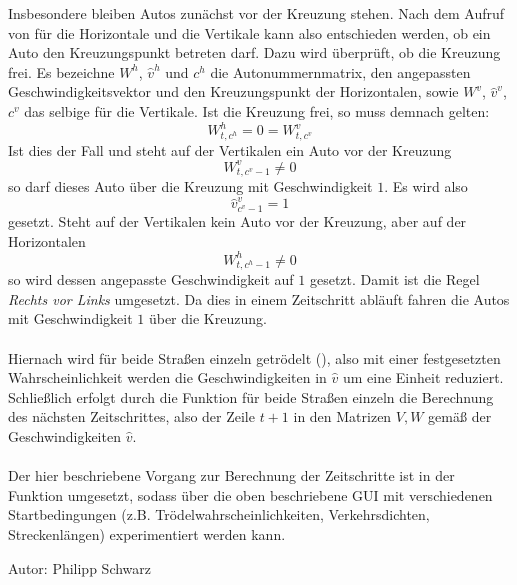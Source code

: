 Insbesondere bleiben Autos zunächst vor der Kreuzung stehen. Nach dem Aufruf von  für die
Horizontale und die Vertikale kann also entschieden werden, ob ein Auto den Kreuzungspunkt betreten darf. 
Dazu wird überprüft, ob die Kreuzung frei. Es bezeichne \(W^h\), \(\hat{v}^h\) und \(c^h\) 
die Autonummernmatrix, den angepassten Geschwindigkeitsvektor und den Kreuzungspunkt der Horizontalen, sowie
\(W^v\), \(\hat{v}^v\), \(c^v\) das selbige für die Vertikale. Ist die Kreuzung frei, so muss demnach gelten: 
\[W^h_{t,c^h} = 0 = W^v_{t,c^v}\] 
Ist dies der Fall und steht auf der Vertikalen
ein Auto vor der Kreuzung 
\[W^v_{t,c^v-1} \neq 0\] so darf dieses Auto über die Kreuzung mit Geschwindigkeit \(1\). 
Es wird also 
\[\hat{v}^v_{c^v-1} = 1\] 
gesetzt. Steht auf der Vertikalen kein Auto vor der Kreuzung, 
aber auf der Horizontalen 
\[W^h_{t,c^h-1} \neq 0\]
so wird dessen angepasste Geschwindigkeit auf \(1\) gesetzt. 
Damit ist die Regel \textit{Rechts vor Links} umgesetzt.
Da dies in einem Zeitschritt abläuft fahren die Autos mit Geschwindigkeit \(1\) über die Kreuzung.
\\ \\
Hiernach wird für beide Straßen einzeln getrödelt (), also mit einer festgesetzten Wahrscheinlichkeit werden
die Geschwindigkeiten in \(\hat{v}\) um eine Einheit reduziert. 
Schließlich erfolgt durch die Funktion  für beide Straßen einzeln die Berechnung des nächsten Zeitschrittes, 
also der Zeile \(t+1\) in den Matrizen \(V,W\) gemäß der Geschwindigkeiten \(\hat{v}\).
\\ \\
Der hier beschriebene Vorgang zur Berechnung der Zeitschritte ist in der Funktion  umgesetzt, 
sodass über die oben beschriebene GUI mit verschiedenen Startbedingungen (z.B. Trödelwahrscheinlichkeiten, Verkehrsdichten, Streckenlängen) experimentiert werden kann.

\begin{flushright}
Autor: Philipp Schwarz
\end{flushright}
